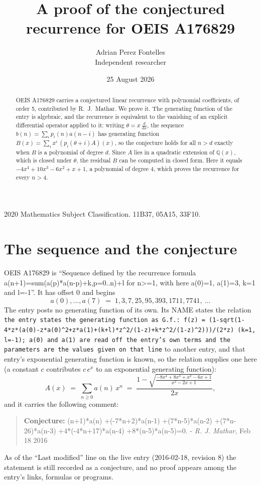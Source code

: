 \documentclass[11pt,a4paper]{article}
\title{A proof of the conjectured recurrence for OEIS A176829}
\author{Adrian Perez Fontelles\\ \small Independent researcher}
\date{25 August 2026}
\theoremstyle{plain}
\theoremstyle{definition}
\begin{document}
\maketitle

\begin{abstract}
OEIS A176829 carries a conjectured linear recurrence with polynomial coefficients, of
order 5, contributed by R.~J.~Mathar. We prove it. The generating function of the
entry is algebraic, and the recurrence is equivalent to the vanishing of an explicit
differential operator applied to it: writing $\theta=x\,\frac{d}{dx}$, the sequence
$b(n)=\sum_{i}p_{i}(n)a(n-i)$ has generating function
$B(x)=\sum_{i}x^{i}\,(p_{i}(\theta+i)A)(x)$, so the conjecture holds for all $n>d$ exactly
when $B$ is a polynomial of degree $d$. Since $A$ lies in a quadratic extension of
$\mathbb{Q}(x)$, which is closed under $\theta$, the residual $B$ can be computed in
closed form. Here it equals $- 4 x^{4} + 10 x^{3} - 6 x^{2} + x + 1$, a polynomial of degree $4$, which proves
the recurrence for every $n>4$.
\end{abstract}

\noindent\small 2020 Mathematics Subject Classification. 11B37, 05A15, 33F10.\normalsize

\section{The sequence and the conjecture}

OEIS A176829 is ``Sequence defined by the recurrence formula a(n+1)=sum(a(p)*a(n-p)+k,p=0..n)+l for n>=1, with here a(0)=1, a(1)=3, k=1 and l=-1''. It has offset $0$ and begins
\[
a(0),\dots,a(7)\;=\;1, 3, 7, 25, 95, 393, 1711, 7741,\ \dots
\]
The entry posts no generating function of its own. Its NAME states the
relation \texttt{the entry states the generating function as G.f.: f(z) = (1-sqrt(1-4*z*(a(0)-z*a(0)\textasciicircum{}2+z*a(1)+(k+l)*z\textasciicircum{}2/(1-z)+k*z\textasciicircum{}2/(1-z)\textasciicircum{}2)))/(2*z) (k=1, l=-1); a(0) and a(1) are read off the entry's own terms and the parameters are the values given on that line} to another entry, and that entry's exponential generating
function is known, so the relation supplies one here (a constant $c$ contributes
$c\,e^{x}$ to an exponential generating function):
\begin{equation}\label{eq:gf}
A(x)\;=\;\sum_{n\ge 0} a(n)\,x^{n}\;=\;\frac{1 - \sqrt{\frac{- 8 x^{4} + 8 x^{3} + x^{2} - 6 x + 1}{x^{2} - 2 x + 1}}}{2 x} ,
\end{equation}
and it carries the following comment:
\begin{quote}\small
\textbf{Conjecture:} (n+1)*a(n) +(-7*n+2)*a(n-1) +(7*n-5)*a(n-2) +(7*n-26)*a(n-3) +4*(-4*n+17)*a(n-4) +8*(n-5)*a(n-5)=0. - \emph{R. J. Mathar}, Feb 18 2016
\end{quote}
As of the ``Last modified'' line on the live entry (2016-02-18, revision 8) the
statement is still recorded as a conjecture, and no proof appears among the entry's links,
formulas or programs.
\end{document}
